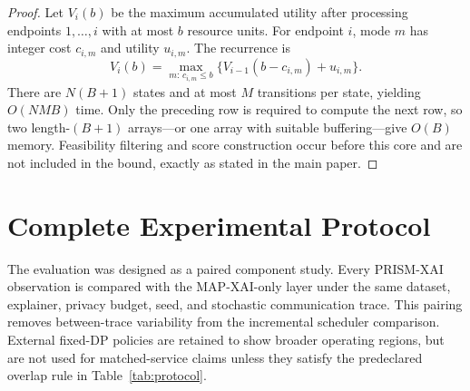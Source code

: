 \documentclass[10pt,conference]{IEEEtran}
\begin{document}
\begin{proof}
Let $V_i(b)$ be the maximum accumulated utility after processing endpoints
$1,\ldots,i$ with at most $b$ resource units. For endpoint $i$, mode $m$ has
integer cost $c_{i,m}$ and utility $u_{i,m}$. The recurrence is
\begin{equation}
V_i(b)=\max_{m:\,c_{i,m}\leq b}
\{V_{i-1}(b-c_{i,m})+u_{i,m}\}.
\end{equation}
There are $N(B+1)$ states and at most $M$ transitions per state, yielding
$O(NMB)$ time. Only the preceding row is required to compute the next row, so
two length-$(B+1)$ arrays---or one array with suitable buffering---give
$O(B)$ memory. Feasibility filtering and score construction occur before this
core and are not included in the bound, exactly as stated in the main paper.
\end{proof}

\FloatBarrier
\section{Complete Experimental Protocol}

The evaluation was designed as a paired component study. Every PRISM-XAI
observation is compared with the MAP-XAI-only layer under the same dataset,
explainer, privacy budget, seed, and stochastic communication trace. This
pairing removes between-trace variability from the incremental scheduler
comparison. External fixed-DP policies are retained to show broader operating
regions, but are not used for matched-service claims unless they satisfy the
predeclared overlap rule in Table~\ref{tab:protocol}.
\end{document}

